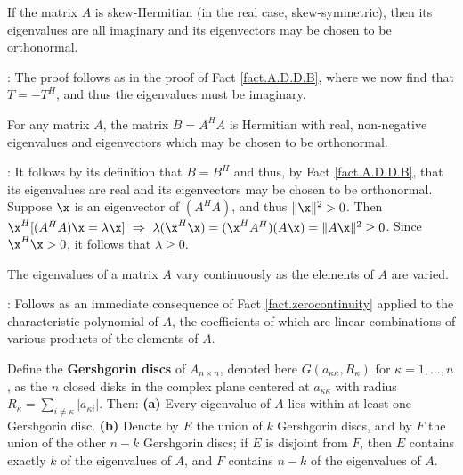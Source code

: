 \begin{fact} \label{fact.A.D.D.C}
If the matrix $A$ is skew-Hermitian (in the real case,
skew-symmetric), then its eigenvalues are all imaginary and its
eigenvectors may be chosen to be orthonormal.
\end{fact}

\/: The proof follows as in the proof of Fact
\ref{fact.A.D.D.B}, where we now find that $T=-T^{H}$, and thus the
eigenvalues must be imaginary.   \endproof

\begin{fact} \label{fact.A.D.D.D}
For any matrix $A$, the matrix $B=A^{H} A$ is Hermitian with real,
non-negative eigenvalues and eigenvectors which may be chosen to be
orthonormal.
\end{fact}

\/: It follows by its definition
that $B=B^{H}$ and thus, by Fact \ref{fact.A.D.D.B}, that its
eigenvalues are real and its eigenvectors may be chosen to be
orthonormal.  Suppose $\x$ is an eigenvector of $(A^{H}A)$, and thus $\Vert \x\Vert^{2}>0$.  Then
$\x^{H}[(A^{H}A)\x=\lambda \x]\ \Rightarrow\ \lambda (\x^{H}\x) = (\x^{H}A^{H})(A\x) = \Vert A\x\Vert^{2} \ge 0$.
Since $\x^{H}\x>0$, it follows that $\lambda\ge 0$.   \endproof

\begin{fact} \label{fact.eigenvaluecontinuity} The eigenvalues of a matrix $A$ vary continuously as the elements of $A$ are varied.
\end{fact}

\/: Follows as an immediate consequence of Fact \ref{fact.zerocontinuity} applied to the characteristic polynomial of $A$,
the coefficients of which are linear combinations of various products of the elements of $A$. \endproof

\begin{fact} \label{fact.Gershgorin}
Define the {\bf Gershgorin discs} of $A_{n\times n}$, denoted here $G(a_{\kappa\kappa},R_\kappa)$ for $\kappa=1,\ldots,n$,
as the $n$ closed disks in the complex plane centered at $a_{\kappa\kappa}$ with radius $R_\kappa=\sum_{i\ne\kappa} |a_{\kappa i}|$. Then:\break
{\bf (a)} Every eigenvalue of $A$ lies within at least one Gershgorin disc.
{\bf (b)} Denote by $E$ the union of $k$ Gershgorin discs, and by $F$ the union of the other $n-k$ Gershgorin discs; if $E$ is disjoint from $F$, then
$E$ contains exactly $k$ of the eigenvalues of $A$, and $F$ contains $n-k$ of the eigenvalues of $A$.
\end{fact}

